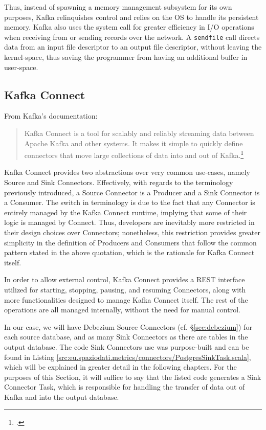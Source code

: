 Thus, instead of spawning a memory management subsystem for its own purposes, Kafka relinquishes control and relies on the OS to handle its persistent memory.
Kafka also uses the \cite[\texttt{sendfile}(2)]{linux-man} system call for greater efficiency in I/O operations when receiving from or sending records over the network.
A \texttt{sendfile} call directs data from an input file descriptor to an output file descriptor, without leaving the kernel-space, thus saving the programmer from having an additional buffer in user-space.


\subsection{Kafka Connect}
\label{sec:kafka-connect}

From Kafka's documentation:
\begin{quote}
	Kafka Connect is a tool for scalably and reliably streaming data between Apache Kafka and other systems. It makes it simple to quickly define connectors that move large collections of data into and out of Kafka.\footcite[\S 8.1]{kafka-docs}
\end{quote}

Kafka Connect provides two abstractions over very common use-cases, namely Source and Sink Connectors.
Effectively, with regards to the terminology previously introduced, a Source Connector is a Producer and a Sink Connector is a Consumer.
The switch in terminology is due to the fact that any Connector is entirely managed by the Kafka Connect runtime, implying that some of their logic is managed by Connect.
Thus, developers are inevitably more restricted in their design choices over Connectors; nonetheless, this restriction provides greater simplicity in the definition of Producers and Consumers that follow the common pattern stated in the above quotation, which is the rationale for Kafka Connect itself.

In order to allow external control, Kafka Connect provides a REST interface utilized for starting, stopping, pausing, and resuming Connectors, along with more functionalities designed to manage Kafka Connect itself.
The rest of the operations are all managed internally, without the need for manual control.

In our case, we will have Debezium Source Connectors (cf. \S \ref{sec:debezium}) for each source database, and as many Sink Connectors as there are tables in the output database.
The code Sink Connectors use was purpose-built and can be found in Listing \ref{src:eu.spaziodati.metrics/connectors/PostgresSinkTask.scala}, which will be explained in greater detail in the following chapters.
For the purposes of this Section, it will suffice to say that the listed code generates a Sink Connector Task, which is responsible for handling the transfer of data out of Kafka and into the output database.


